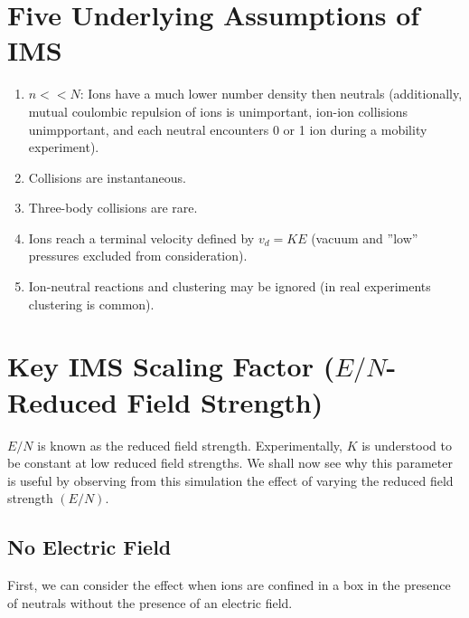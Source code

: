 \documentclass[10pt,a4paper,final]{article}
\begin{document}
\section{Five Underlying Assumptions of IMS}
\begin{enumerate}
	\item $n << N$: Ions have a much lower number density then neutrals (additionally, mutual coulombic repulsion of ions is unimportant, ion-ion collisions unimpportant, and each neutral encounters 0 or 1 ion during a mobility experiment).
	\item Collisions are instantaneous.
	\item Three-body collisions are rare.
	\item  Ions reach a terminal velocity defined by $v_d=KE$ (vacuum and  ''low'' pressures excluded from consideration).
	\item Ion-neutral reactions and clustering may be ignored (in real experiments clustering is common).	
\end{enumerate}
\section{Key IMS Scaling Factor ($E/N$- Reduced Field Strength)}
$E/N$ is known as the reduced field strength. Experimentally, $K$ is understood to be constant at low reduced field strengths. We shall now see why this parameter is useful by observing from this simulation the effect of varying the reduced field strength $(E/N)$.
\subsection{No Electric Field}
First, we can consider the effect when ions are confined in a box in the presence of neutrals without the presence of an electric field.
	
	
	
	
	
	
	
	
\end{document}
